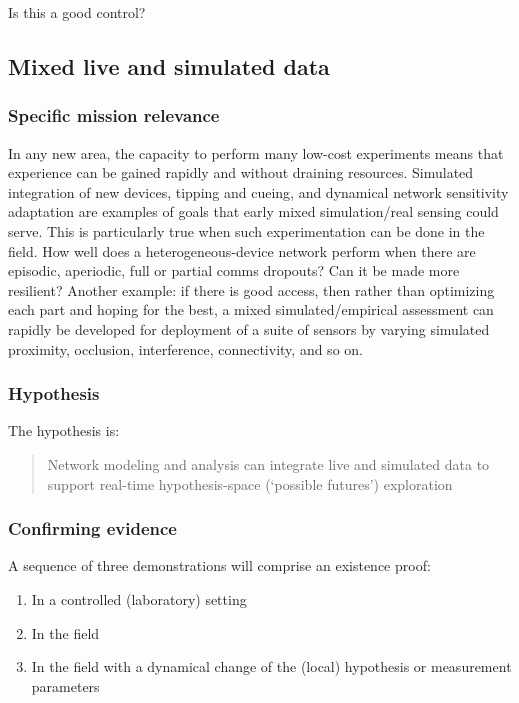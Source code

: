 \documentclass{article} %
\begin{document}
{\color {red} Is this a good control?}

\pagebreak
\subsection{Mixed live and simulated data}
\subsubsection{Specific mission relevance}
In any new area, the capacity to perform many low-cost experiments means that experience can be gained rapidly and without draining resources. Simulated integration of new devices, tipping and cueing, and dynamical network sensitivity adaptation are examples of goals that early mixed simulation/real sensing could serve. This is particularly true when such experimentation can be done in the field. How well does a heterogeneous-device network perform when there are episodic, aperiodic, full or partial comms dropouts? Can it be made more resilient? Another example: if there is good access, then rather than optimizing each part and hoping for the best, a mixed simulated/empirical assessment can rapidly be developed for deployment of a suite of sensors by varying simulated proximity, occlusion, interference, connectivity, and so on.

\subsubsection{Hypothesis}
The hypothesis is:
\begin{quote}
Network modeling and analysis can integrate  live and simulated data to support real-time hypothesis-space (`possible futures') exploration
\end{quote}

\subsubsection{Confirming evidence}
A sequence of three demonstrations will comprise an existence proof:
\begin{enumerate}
\item In a controlled (laboratory) setting
\item In the field
\item In the field with a dynamical change of the (local) hypothesis or measurement parameters
\end{enumerate}
\end{document}
